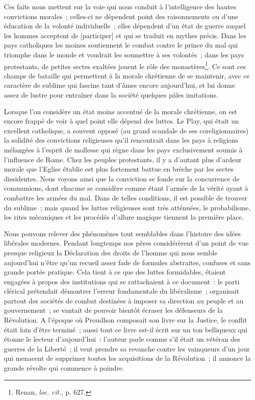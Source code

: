 \documentclass[french,twoside]{book} %
\newcommand\corr[1]{#1}
\begin{document}
\noindent Ces faits nous mettent sur la voie qui nous conduit à l’intelligence des hautes convictions morales ; celles-ci ne dépendent point des raisonnements ou d’une éducation de la volonté individuelle ; elles dépendent d’un état de guerre auquel les hommes acceptent de [{\corr participer}] et qui se traduit en mythes précis. Dans les pays catholiques les moines soutiennent le combat contre le prince du mal qui triomphe dans le monde et voudrait les soumettre à ses volontés ; dans les pays protestants, de petites sectes exaltées jouent le rôle des monastères\footnote{ \noindent Renan, \emph{loc. cit.}, p. 627.
 }. Ce sont ces champs de bataille qui permettent à la morale chrétienne de se maintenir, avec ce caractère de sublime qui fascine tant d’âmes encore aujourd’hui,  et lui donne assez de lustre pour entraîner dans la société quelques pâles imitations.\par
Lorsque l’on considère un état moins accentué de la morale chrétienne, on est encore frappé de voir à quel point elle dépend des luttes. Le Play, qui était un excellent catholique, a souvent opposé (au grand scandale de ses coreligionnaires) la solidité des convictions religieuses qu’il rencontrait dans les pays à religions mélangées à l’esprit de mollesse qui règne dans les pays exclusivement soumis à l’influence de Rome. Chez les peuples protestants, il y a d’autant plus d’ardeur morale que l’Eglise établie est plus fortement battue en brèche par les sectes dissidentes. Nous voyons ainsi que la conviction se fonde sur la concurrence de communions, dont chacune se considère comme étant l’armée de la vérité ayant à combattre les armées du mal. Dans de telles conditions, il est possible de trouver du sublime ; mais quand les luttes religieuses sont très atténuées, le probabilisme, les rites mécaniques et les procédés d’allure magique tiennent la première place.\par
Nous pouvons relever des phénomènes tout semblables dans l’histoire des idées libérales modernes. Pendant longtemps nos pères considérèrent d’un point de vue presque religieux la Déclaration des droits de l’homme qui nous semble aujourd’hui n’être qu’un recueil assez fade de formules abstraites, confuses et sans grande portée pratique. Cela tient à ce que des luttes formidables, étaient engagées à propos des institutions qui se rattachaient à ce document : le parti clérical prétendait démontrer l’erreur fondamentale du libéralisme ; organisait partout des sociétés de combat destinées à imposer  sa direction au peuple et au gouvernement ; se vantait de pouvoir bientôt écraser les défenseurs de la Révolution. A l’époque où Proudhon composait son livre sur la Justice, le conflit était loin d’être terminé ; aussi tout ce livre est-il écrit sur un ton belliqueux qui étonne le lecteur d’aujourd’hui : l’auteur parle comme s’il était un vétéran des guerres de la Liberté ; il veut prendre sa revanche contre les vainqueurs d’un jour qui menacent de supprimer toutes les acquisitions de la Révolution ; il annonce la grande révolte qui commence à poindre.\par
\end{document}

